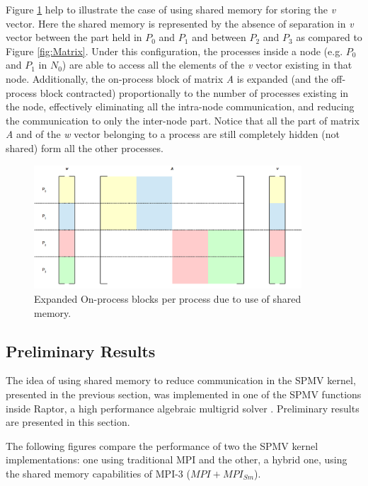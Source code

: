 \medskip

Figure \ref{fig:MatrixSm} help to illustrate the case of using shared memory for storing the \emph{v} vector. Here the shared memory is represented by the absence of separation in \emph{v} vector between the part held in $P_0$ and $P_1$ and between $P_2$ and $P_3$ as compared to Figure \ref{fig:Matrix}. Under this configuration, the processes inside a node (e.g. $P_0$ and $P_1$ in $N_0$) are able to access all the elements of the \emph{v} vector existing in that node. Additionally, the on-process block of matrix \emph{A} is expanded (and the off-process block contracted) proportionally to the number of processes existing in the node, effectively eliminating all the intra-node communication, and reducing the communication to only the inter-node part. Notice that all the part of matrix \emph{A} and of the \emph{w} vector belonging to a process are still completely hidden (not shared) form all the other processes.



\begin{figure}[t!]
    \centering
    \includegraphics[width=100mm]{Plots/HybridProgramming/matrixSm.png}
    \caption{Expanded On-process blocks per process due to use of shared memory.}
    \label{fig:MatrixSm}
\end{figure}

\medskip

\subsection*{Preliminary Results}


The idea of using shared memory to reduce communication in the SPMV kernel, presented in the previous section,
was implemented in one of the SPMV functions inside Raptor, a high performance algebraic multigrid solver \cite{BiOl2017}. Preliminary results are presented in this section. 

\medskip

The following figures compare the performance of two the SPMV kernel implementations: one using traditional MPI and the other, a hybrid one, using the shared memory capabilities of MPI-3 ($MPI+MPI_{Sm}$).


